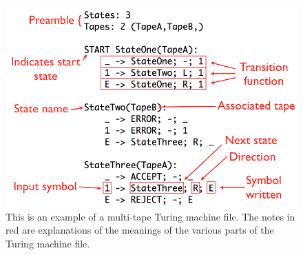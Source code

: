 \documentclass{report}
\begin{document}
\begin{figure} 
\begin{center} 
\includegraphics[scale=0.4]{figs/annotatedtm.png} 
\caption{This is an example of a multi-tape Turing machine file. The notes in red are explanations of the meanings of the various parts of the Turing machine file. \label{fig:example}} 
\end{center} 
\end{figure}
\end{document}
